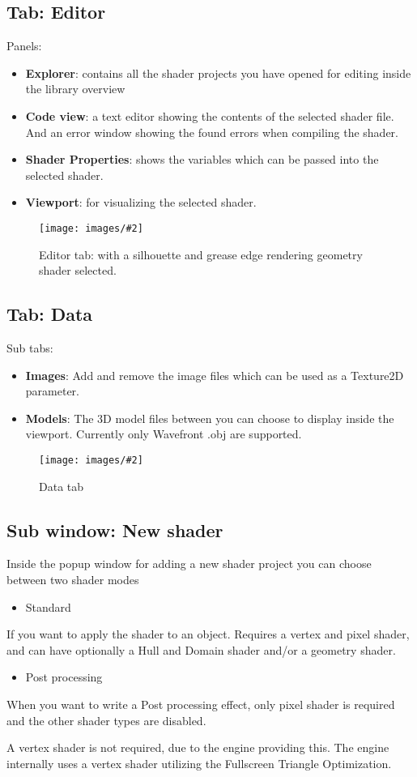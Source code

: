 \documentclass{paper}
\newlength{\imgwidth} %
\newcommand\scalegraphics[3][]
{
	\begin{figure}[H]
	\centering
	\settowidth{\imgwidth}{\texttt{[image: images/\#2]}} %
	\setlength{\imgwidth}{\minof{#1\imgwidth}{\textwidth}} %
	\texttt{[image: images/\#2]} %
	\caption{#3}
	\end{figure}
}
\begin{document}
\newpage
\subsection{Tab: Editor}\label{subsec:tab_e}
Panels:
\begin{itemize}
	\item \textbf{Explorer}: contains all the shader projects you have opened for editing inside the library overview
	\item \textbf{Code view}: a text editor showing the contents of the selected shader file. And an error window showing the found errors when compiling the shader.
	\item \textbf{Shader Properties}: shows the variables which can be passed into the selected shader.
	\item \textbf{Viewport}: for visualizing the selected shader.
\end{itemize}
\scalegraphics{editor.png}{Editor tab: with a silhouette and grease edge rendering geometry shader selected.}

\newpage
\subsection{Tab: Data}\label{subsec:tab_d}
Sub tabs:
\begin{itemize}
	\item \textbf{Images}: Add and remove the image files which can be used as a Texture2D parameter.
	\item \textbf{Models}: The 3D model files between you can choose to display inside the viewport. Currently only Wavefront .obj are supported.
\end{itemize}
\scalegraphics{data.png}{Data tab}

\newpage
\subsection{Sub window: New shader}\label{subsec:tab_d}
Inside the popup window for adding a new shader project you can choose between two shader modes
\begin{itemize}
\item Standard
\end{itemize}
If you want to apply the shader to an object. Requires a vertex and pixel shader, and can have optionally a Hull and Domain shader and/or a geometry shader.

\begin{itemize}
\item Post processing
\end{itemize}
When you want to write a Post processing effect, only pixel shader is required and the other shader types are disabled.
\par
A vertex shader is not required, due to the engine providing this. The engine internally uses a vertex shader utilizing the Fullscreen Triangle Optimization.
\end{document}
